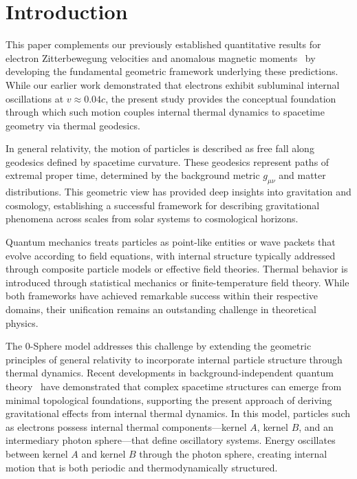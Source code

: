 \documentclass[%
 reprint,
 amsmath,amssymb,
 aps,
]{revtex4-1}
\numberwithin{equation}{section}%
\begin{document}
\maketitle

\section{Introduction}
\label{sec:Introduction}

This paper complements our previously established quantitative results for electron Zitterbewegung velocities and anomalous magnetic moments~\cite{hanamura2501.0130, hanamura2507.0033} by developing the fundamental geometric framework underlying these predictions. While our earlier work demonstrated that electrons exhibit subluminal internal oscillations at $v \approx 0.04c$, the present study provides the conceptual foundation through which such motion couples internal thermal dynamics to spacetime geometry via thermal geodesics.

In general relativity, the motion of particles is described as free fall along geodesics defined by spacetime curvature. These geodesics represent paths of extremal proper time, determined by the background metric $g_{\mu\nu}$ and matter distributions. This geometric view has provided deep insights into gravitation and cosmology, establishing a successful framework for describing gravitational phenomena across scales from solar systems to cosmological horizons.

Quantum mechanics treats particles as point-like entities or wave packets that evolve according to field equations, with internal structure typically addressed through composite particle models or effective field theories. Thermal behavior is introduced through statistical mechanics or finite-temperature field theory. While both frameworks have achieved remarkable success within their respective domains, their unification remains an outstanding challenge in theoretical physics.

The 0-Sphere model addresses this challenge by extending the geometric principles of general relativity to incorporate internal particle structure through thermal dynamics. Recent developments in background-independent quantum theory~\cite{hanamura2507.0081} have demonstrated that complex spacetime structures can emerge from minimal topological foundations, supporting the present approach of deriving gravitational effects from internal thermal dynamics. In this model, particles such as electrons possess internal thermal components—kernel $A$, kernel $B$, and an intermediary photon sphere—that define oscillatory systems. Energy oscillates between kernel $A$ and kernel $B$ through the photon sphere, creating internal motion that is both periodic and thermodynamically structured.
\end{document}
